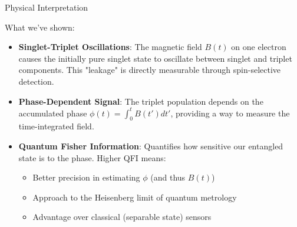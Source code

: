 \documentclass{beamer}
\begin{document}
\begin{frame}{Physical Interpretation}

\begin{alertblock}{What we've shown:}
\begin{itemize}
\item \textbf{Singlet-Triplet Oscillations}: The magnetic field $B(t)$ on one electron causes the initially pure singlet state to oscillate between singlet and triplet components. This "leakage" is directly measurable through spin-selective detection.
\item \textbf{Phase-Dependent Signal}: The triplet population depends on the accumulated phase $\phi(t) = \int_0^t B(t') dt'$, providing a way to measure the time-integrated field.

\item \textbf{Quantum Fisher Information}: Quantifies how sensitive our entangled state is to the phase. Higher QFI means:
\begin{itemize}
\item Better precision in estimating $\phi$ (and thus $B(t)$)
\item Approach to the Heisenberg limit of quantum metrology
\item Advantage over classical (separable state) sensors
\end{itemize}
\end{itemize}
\end{alertblock}
\end{frame}
\end{document}
